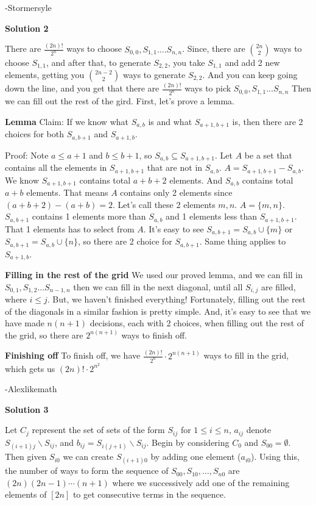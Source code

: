 \begin{enumerate}
 -Stormersyle

 



\textbf{Solution 2}

There are $\frac{(2n)!}{2^n}$ ways to choose $S_{0,0}, S_{1,1} .... S_{n,n}$. Since, there are $\binom{2n}{2}$ ways to choose $S_{1,1}$, and after that, to generate $S_{2,2}$, you take $S_{1,1}$ and add 2 new elements, getting you $\binom{2n-2}{2}$ ways to generate $S_{2,2}$. And you can keep going down the line, and you get that there are $\frac{(2n)!}{2^n}$ ways to pick $S_{0,0}, S_{1,1} ... S_{n,n}$ Then we can fill out the rest of the gird. First, let’s prove a lemma.

 \textbf{Lemma} Claim: If we know what $S_{a,b}$ is and what $S_{a+1,b+1}$ is, then there are 2 choices for both $S_{a,b+1}$ and $S_{a+1,b}$.

 Proof: Note $a \leq a+1$ and $b \leq b+1$, so $S_{a,b}\subseteq S_{a+1,b+1}$. Let $A$ be a set that contains all the elements in $S_{a+1,b+1}$ that are not in $S_{a,b}$. $A = S_{a+1,b+1} - S_{a,b}$. We know $S_{a+1,b+1}$ contains total $a+b+2$ elements. And $S_{a,b}$ contains total $a+b$ elements. That means $A$ contains only 2 elements since $(a+b+2)-(a+b) = 2$. Let’s call these 2 elements $m, n$. $A = \{m, n\}$. $S_{a,b+1}$ contains 1 elements more than $S_{a,b}$ and 1 elements less than $S_{a+1,b+1}$. That 1 elements has to select from $A$. It’s easy to see $S_{a,b+1} = S_{a,b}\cup \{m\}$ or $S_{a,b+1} = S_{a,b}\cup \{n\}$, so there are 2 choice for $S_{a,b+1}$. Same thing applies to $S_{a+1,b}$.

 \textbf{Filling in the rest of the grid} We used our proved lemma, and we can fill in $S_{0,1}, S_{1,2} ... S_{n-1,n}$ then we can fill in the next diagonal, until all $S_{i,j}$ are filled, where $i \leq j$. But, we haven’t finished everything! Fortunately, filling out the rest of the diagonals in a similar fashion is pretty simple. And, it’s easy to see that we have made $n(n+1)$ decisions, each with 2 choices, when filling out the rest of the grid, so there are $2^{n(n+1)}$ ways to finish off.

 \textbf{Finishing off} To finish off, we have $\frac{(2n)!}{2^n} \cdot 2^{n(n+1)}$ ways to fill in the grid, which gets us $\boxed{(2n)! \cdot 2^{n^2}}$

 -Alexlikemath

 



\textbf{Solution 3}

Let $C_{j}$ represent the set of sets of the form $S_{ij}$ for $1 \le i \le n$, $a_{ij}$ denote $S_{(i+1)j} \backslash S_{ij}$, and $b_{ij} = S_{i(j+1)} \backslash S_{ij}$. Begin by considering $C_0$ and $S_{00} = \emptyset$. Then  given $S_{i0}$ we can create $S_{(i+1)0}$ by adding one element ($a_{i0}$). Using this, the number of ways to form the sequence of $S_{00}, S_{10}, \dots, S_{n0}$ are $(2n)(2n-1) \cdots (n+1)$ where we successively add one of the remaining elements of $[2n]$ to get consecutive terms in the sequence.


\end{enumerate}
